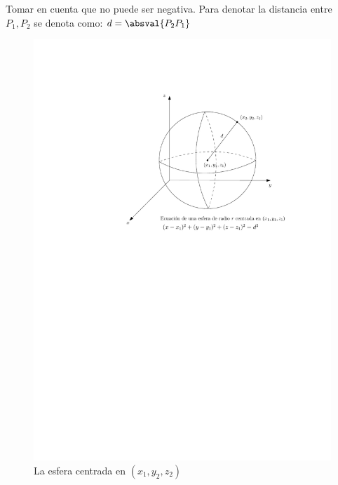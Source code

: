 {
    Tomar en cuenta que no puede ser negativa. \newline Para denotar la distancia entre $\displaystyle P_1,P_2$ se denota como: $\displaystyle d = \absval{P_2 P_1} $ 

    \begin{center}
        \begin{figure}[H]
            \centering
            \includegraphics[scale=0.75]{Clases/figs/2020-01-23-03} 
            \caption{La esfera centrada en $(x_1,y_2,z_2)$} 
        \end{figure}
    \end{center}
}

